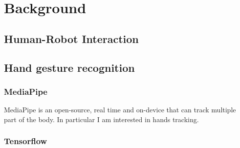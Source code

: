 \documentclass[../thesis.tex]{subfiles}
\begin{document}
\chapter{Background}\label{cap:background}

\section{Human-Robot Interaction}

\section{Hand gesture recognition}
\subsection{MediaPipe}
MediaPipe is an open-source, real time and on-device that can track multiple part of the body. In particular I am interested in hands tracking.\cite{article:mediapipe}

\subsection{Tensorflow}
\end{document}
